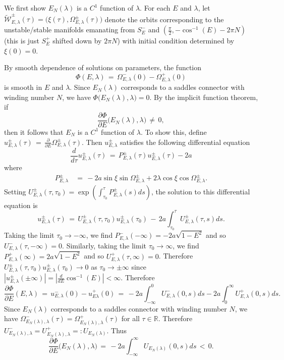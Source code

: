 \documentclass[11 pt]{article}
\renewcommand\l{\lambda}
\renewcommand\({\left(}
\renewcommand\){\right)}
\newcommand\wt{\widetilde}
\newcommand\<{\langle}
\renewcommand\>{\rangle}
\renewcommand\l{\lambda}
\newcommand\8{\infty}
\newcommand{\R}{\mathbb R}
\newcommand{\pd}{\partial}
\newcommand{\mc}{\mathcal}
\begin{document}
\proof
We first show $E_N(\l)$ is a $C^1$ function of $\l$. For each $E$ and $\l$, let $\wt{\mc{W}}^\pm_{E,\l}(\tau) = \big(\xi(\tau), \Omega^\pm_{E,\l}(\tau)\big)$ denote the orbits corresponding to the unstable/stable manifolds emanating from $S^-_E$ and $(\frac{\pi}{2}, -\cos^{-1}(E) - 2\pi N)$ (this is just $S^+_E$ shifted down by $2\pi N$) with initial condition determined by $\xi(0) = 0$. 

By smooth dependence of solutions on parameters, the function 
\[
\Phi(E, \l) \,=\, \Omega^-_{E, \l}(0) - \Omega^+_{E, \l}(0)
\]
is smooth in $E$ and $\l$.  Since $E_N(\l)$ corresponds to a saddles connector with winding number $N$, we have $\Phi\big(E_N(\l), \l\big) = 0$. By the implicit function theorem, if 
\[
\frac{\pd \Phi}{\pd E}\big(E_N(\l), \l\big) \,\neq\, 0,
\]
then it follows that $E_N$ is a $C^1$ function of $\l$. To show this, define $u^\pm_{E,\l}(\tau) \,=\, \frac{\pd}{\pd E}\Omega^\pm_{E, \l}(\tau)$. Then $u^\pm_{E,\l}$ satisfies the following differential equation
\[
\frac{d}{d\tau}u^\pm_{E,\l}(\tau) \,=\, P^\pm_{E,\l}(\tau) u^\pm_{E,\l}(\tau) -2a
\]
where
\begin{align*}
P^\pm_{E,\l} \,&=\, -2a\sin\xi\sin \Omega^\pm_{E,\l} + 2\l\cos\xi \cos \Omega^\pm_{E,\l}.
\end{align*}
Setting $U^\pm_{E,\l}(\tau,\tau_0) = \exp(\int_{\tau_0}^\tau P^\pm_{E,\l}(s)ds )$, the solution to this differential equation is
\[
u^\pm_{E,\l}(\tau) \,=\, U^\pm_{E,\l}(\tau,\tau_0)u^\pm_{E,\l}(\tau_0) \,-\, 2a\int_{\tau_0}^\tau U^\pm_{E,\l}(\tau,s)ds. 
\]
Taking the limit $\tau_0 \to - \infty$, we find $P^-_{E,\l}(-\infty) = -2a\sqrt{1 - E^2}$ and so $U^-_{E,\l}(\tau,-\infty) = 0$. Similarly, taking the limit $\tau_0 \to \infty$, we find $P^+_{E,\l}(\infty) = 2a\sqrt{1-E^2}$ and so $U^+_{E,\l}(\tau,\infty) = 0$. Therefore $U^\pm_{E,\l}(\tau,\tau_0) u^\pm_{E,\l}(\tau_0) \to 0$ as $\tau_0 \to \pm\infty$ since $|u^\pm_{E,\l}(\pm \infty)| = |\frac{d}{dE} \cos^{-1}(E)| < \infty$.  Therefore
\[
\frac{\pd \Phi}{\pd E}(E, \l) \,=\, u^-_{E,\l}(0) - u^+_{E\l}(0) \,=\, -2a\int_{-\infty}^0U^-_{E,\l}(0,s)ds - 2a\int_0^\infty U^+_{E,\l}(0,s)ds. 
\]
Since $E_N(\l)$ corresponds to a saddles connector with winding number $N$, we have $\Omega^-_{E_N(\l),\l}(\tau) = \Omega^+_{E_N(\l), \l}(\tau)$ for all $\tau \in \R$. Therefore $U^-_{E_N(\l),\l} = U^+_{E_N(\l),\l} =: U_{E_N(\l)}$. Thus
\[
\frac{\pd \Phi}{\pd E}\big(E_N(\l), \l\big) \,=\, -2a\int_{-\infty}^\infty U_{E_N(\l)}(0,s)ds \,<\, 0.
\]
\end{document}

